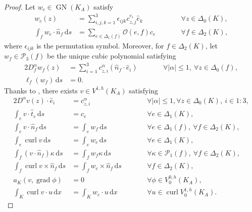 \documentclass{mcom-l}
\theoremstyle{definition}
\theoremstyle{remark}
\numberwithin{equation}{section}
\newcommand{\unitvec}[1]{\hat{#1}}
\renewcommand{\d}[1]{\,\mathrm{d}{#1}}
\DeclareMathOperator{\GN}{GN}
\DeclareMathOperator{\curl}{curl}
\DeclareMathOperator{\grad}{grad}
\begin{document}
\begin{proof}
	Let $w_c \in \GN(K_A)$ satisfy
	\begin{subequations}
		\label{eq:proof:gn-interp-curl}
		\begin{alignat}{2}
			w_c(z) &= \sum_{i, j, k=1}^{3} \epsilon_{ijk} c_{z, j}^{e_i} 
			\unitvec{e}_k \qquad
			& &\forall z \in \Delta_0(K), \\
			\int_{f} w_c \cdot \unitvec{n}_f \d{s} &= 
			\sum_{e \in \Delta_1(f)}  \mathcal{O}(e, f) c_e \qquad
			& &\forall f \in \Delta_2(K),
		\end{alignat}	
	\end{subequations}
	where $\epsilon_{ijk}$ is the permutation symbol. 
	Moreover, for $f \in \Delta_2(K)$, let $w_f \in \mathcal{P}_3(f)$ be 
	the unique cubic polynomial satisfying
	\begin{alignat*}{2}
		D_f^{\alpha} w_f(z) &= \sum_{i=1}^{3} c_{z, i}^{\alpha} 
		(\unitvec{n}_f \cdot \unitvec{e}_i) \qquad 
		& &\forall |\alpha| \leq 1, \ \forall z \in \Delta_0(f), \\
		\ell_f(w_f) \d{s} &= 0. \qquad & &
	\end{alignat*}
	Thanks to \cite[Lemma 4.11]{FuGuzmanNeilan20}, there exists 
	$v \in V^{1, h}(K_A)$ satisfying
	\begin{alignat*}{2}
		D^{\alpha} v(z) \cdot \unitvec{e}_i &= c_{z, i}^{\alpha} 
		\qquad & &\forall |\alpha| \leq 1, 
		\forall z \in \Delta_0(K), \ i \in 1:3, \\
		\int_{e} v \cdot \unitvec{t}_e \d{s} &= c_{e} 
		\qquad & &\forall e \in \Delta_1(K), \\
		\int_{e} v \cdot \unitvec{n}_f \d{s} &= \int_{e} w_f \d{s} 
		\qquad & & \forall e \in \Delta_1(f), \ 
		\forall f \in \Delta_2(K), \\
		\int_{e} \curl v \d{s} &= \int_{e} w_{c} \d{s} 
		\qquad & &\forall e \in \Delta_1(K), \\
		\int_{f} (v \cdot \unitvec{n}_f) \kappa \d{s} 
		&= \int_{f} w_f \kappa \d{s} 
		\qquad & &\forall \kappa \in \mathcal{P}_1(f), 
		\ \forall f \in \Delta_2(K), \\
		\int_f \curl v \times \unitvec{n}_f \d{s} 
		&= \int_f w_{c} \times \unitvec{n}_f \d{s}
		\qquad & &\forall f \in \Delta_2(K), \\
		a_K(v, \grad \phi) &= 0 
		\qquad & &\forall \phi \in V^{0, h}_0(K_A), \\
		\int_{K}  \curl v \cdot u \d{x} 
		&= \int_{K} w_c \cdot u \d{x}
		\qquad & &\forall u \in 
		\curl V^{1, h}_0(K_A).
	\end{alignat*} 

\end{proof}
\end{document}
